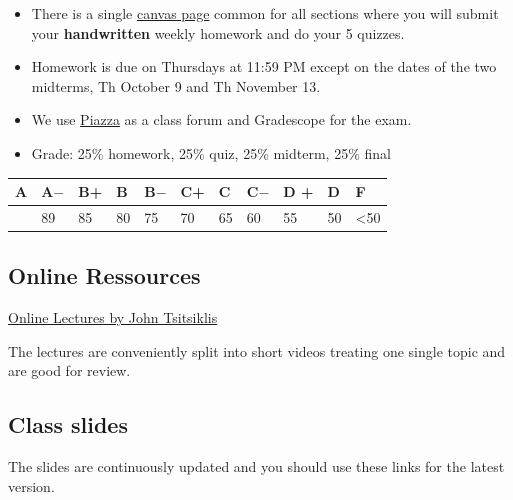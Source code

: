 \documentclass[
  letterpaper,
  DIV=11,
  numbers=noendperiod]{scrartcl}
\begin{document}
\begin{itemize}
\item
  There is a single
  \href{https://umamherst.instructure.com/courses/31946}{canvas page}
  common for all sections where you will submit your
  \textbf{handwritten} weekly homework and do your 5 quizzes.
\item
  Homework is due on Thursdays at 11:59 PM except on the dates of the
  two midterms, Th October 9 and Th November 13.
\item
  We use \href{https://piazza.com/class/meyhwccwkpw66c}{Piazza} as a
  class forum and Gradescope for the exam.
\item
  Grade: 25\% homework, 25\% quiz, 25\% midterm, 25\% final
\end{itemize}

\begin{longtable}[]{@{}lllllllllll@{}}
\toprule\noalign{}
A & A\(-\) & B+ & B & B\(-\) & C+ & C & C\(-\) & D + & D & F \\
\midrule\noalign{}
\endhead
\bottomrule\noalign{}
\endlastfoot
93 & 89 & 85 & 80 & 75 & 70 & 65 & 60 & 55 & 50 & \textless50 \\
\end{longtable}

\subsection{Online Ressources}\label{online-ressources}

\href{https://www.youtube.com/playlist?list=PLUl4u3cNGP60hI9ATjSFgLZpbNJ7myAg6}{Online
Lectures by John Tsitsiklis}

The lectures are conveniently split into short videos treating one
single topic and are good for review.

\subsection{Class slides}\label{class-slides}

The slides are continuously updated and you should use these links for
the latest version.
\end{document}
